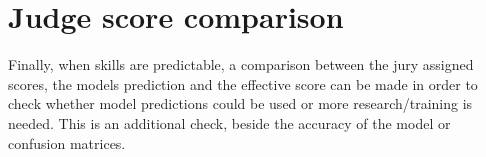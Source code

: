 \section{Judge score comparison}
\label{methodology:judge-score-comparison}

Finally, when skills are predictable, a comparison between the jury assigned scores, the models prediction and the effective score can be made in order to check whether model predictions could be used or more research/training is needed. This is an additional check, beside the accuracy of the model or confusion matrices.

